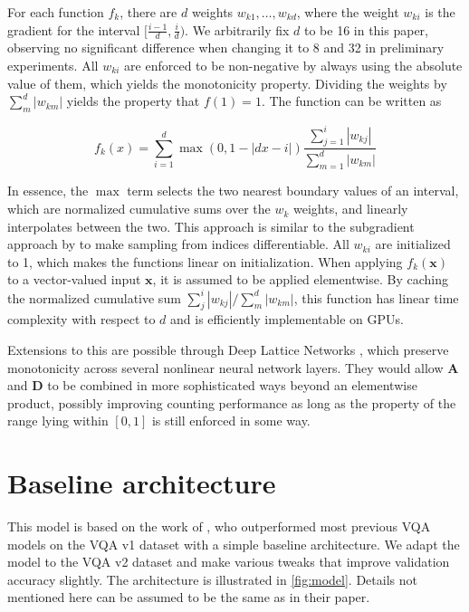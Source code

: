 \documentclass[letterpaper]{article}
\newcommand{\m}[1]{\mathbf{#1}}
\begin{document}
For each function $f_k$, there are $d$ weights $w_{k1}, \ldots, w_{kd}$, where the weight $w_{ki}$ is the gradient for the interval $[\frac{i-1}{d}, \frac{i}{d})$.
We arbitrarily fix $d$ to be 16 in this paper, observing no significant difference when changing it to 8 and 32 in preliminary experiments.
All $w_{ki}$ are enforced to be non-negative by always using the absolute value of them, which yields the monotonicity property.
Dividing the weights by $\sum_m^d |w_{km}|$ yields the property that $f(1) = 1$.
The function can be written as

\begin{equation}
    f_k(x) = \sum_{i=1}^d \max(0, 1 - | d x - i |) \frac{\sum_{j=1}^i |w_{kj}|}{\sum_{m=1}^d |w_{km}|}
\end{equation}

In essence, the $\max$ term selects the two nearest boundary values of an interval, which are normalized cumulative sums over the $w_k$ weights, and linearly interpolates between the two.
This approach is similar to the subgradient approach by \citet{Jaderberg2015a} to make sampling from indices differentiable.
All $w_{ki}$ are initialized to 1, which makes the functions linear on initialization.
When applying $f_k(\m x)$ to a vector-valued input $\m x$, it is assumed to be applied elementwise.
By caching the normalized cumulative sum $ \sum_j^i |w_{kj}| / \sum_m^d |w_{km}|$, this function has linear time complexity with respect to $d$ and is efficiently implementable on GPUs.

Extensions to this are possible through Deep Lattice Networks \citep{You2017a}, which preserve monotonicity across several nonlinear neural network layers.
They would allow $\m A$ and $\m D$ to be combined in more sophisticated ways beyond an elementwise product, possibly improving counting performance as long as the property of the range lying within $[0, 1]$ is still enforced in some way.


\section{Baseline architecture}\label{app:arch}
This model is based on the work of \citet{Kazemi2017a}, who outperformed most previous VQA models on the VQA v1 dataset with a simple baseline architecture.
We adapt the model to the VQA v2 dataset and make various tweaks that improve validation accuracy slightly.
The architecture is illustrated in \autoref{fig:model}.
Details not mentioned here can be assumed to be the same as in their paper.
\end{document}

